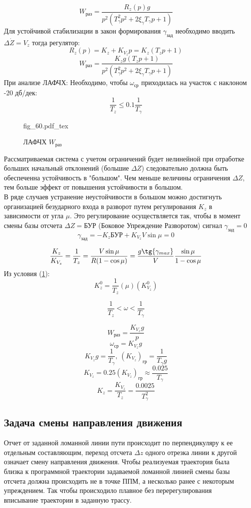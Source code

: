 \documentclass{article}
\newcommand{\incfig}[1]{
    {#1.pdf_tex}
}
\begin{document}
\[
    W_\text{раз} = \frac{R_z(p)g}{p^2(T_\gamma^2 p^2 + 2 \xi_\gamma T_\gamma p
    + 1)}
\]
Для устойчивой стабилизации в закон формирования $\gamma_\text{зад}$ необходимо
вводить $\Delta \dot{Z} = V_{z}$ тогда регулятор:
\[
    R_z(p) = K_z + K_{V_z} p = K_z(T_z p +1)
\]
\[
    W_\text{раз} = \frac{K_z g(T_z p + 1)}{p^2(T_\gamma^2 p^2 + 2 \xi_\gamma
    T_\gamma p + 1)}
\]
При анализе ЛАФЧХ:
Необходимо, чтобы $ \omega_\text{ср}$ приходилась на участок с наклоном -20
дб/дек:
\begin{equation}
    \frac{1}{T_z} \le 0.1 \frac{1}{T_\gamma}
    \label{eq:a2}
\end{equation}

\begin{figure}[H]
    \centering
    \incfig{fig_60}
    \caption{ЛАФЧХ $W_\text{раз}$}
    \label{fig:fig_60}
\end{figure}

Рассматриваемая система с учетом ограничений будет нелинейной при отработке
больших начальный отклонений (большие $\Delta Z$) следовательно должна быть
обеспеченна устойчивость в "большом".
Чем меньше величины ограничения $\Delta Z$, тем больше эффект от повышения
устойчивости в большом.\\
В ряде случаев устранение неустойчивости в большом можно достигнуть
организацией безударного входа в разворот путем регулирования $K_z$ в
зависимости от угла $\mu$.
Это регулирование осуществляется так, чтобы в момент смены базы отсчета $\Delta
Z = \text{БУР}$ (Боковое Упреждение Разворотом) сигнал $ \gamma_\text{зад} =
0$
\[
    \gamma_\text{зад} = -K_z \text{БУР} + K_{V_z} V \sin{\mu} = 0
\]

\[
    \frac{K_z}{K_{V_z}} = \frac{1}{T_z} = \frac{V \sin{\mu}}{R( 1 - \cos{\mu})}
    = \frac{g \tg{\gamma_{max}}}{V} \frac{\sin{\mu}}{1 - \cos{\mu}}
\]
Из условия (\ref{fig:fig_60}):
\[
    K_z^0 = \frac{1}{T_z}(\mu)(K_{V_z}^0)
\]

\[
    \frac{1}{T_z} < \omega < \frac{1}{T_\gamma}
\]

\[
    W_\text{раз} = \frac{K_{V_z} g}{p}
\]
\[
    \omega_\text{ср} = K_{V_z} g
\]
\[
    K_{V_z} g = \frac{1}{T_\gamma} , \ (K_{V_z})_\text{гр} = \frac{1}{T_\gamma
    g}
\]
\[
    K_{V_z} = 0.25(K_{V_z})_\text{гр} \approx \frac{0.025}{T_{\gamma}}
\]
\[
    K_z = \frac{K_{V_z}}{T_z} = \frac{0.0025}{T_\gamma^2}
\]

\subsection{Задача смены направления движения}
Отчет от заданной ломанной линии пути происходит по перпендикуляру к ее
отдельным составляющим, переход отсчета $\Delta z$ одного отрезка линии к
другой означает смену направления движения. Чтобы реализуемая траектория была
близка к программной траектории задаваемой ломанной линией смены базы отсчета
должна происходить не в точке ППМ, а несколько ранее с некоторым упреждением.
Так чтобы происходило плавное без перерегулирования вписывание траектории в
заданную трассу.
\end{document}
